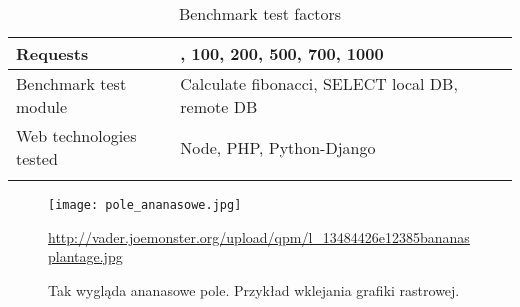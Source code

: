 \documentclass[../thesis.tex]{subfiles}
\begin{document}
\begin{table}[H]
	\caption{Benchmark test factors}
	\centering
	\footnotesize
	\label{tab1}
	\begin{tabular}{!{\color{sapphire}\vrule width 1pt}m{0.22\textwidth}!{\color{black}\vrule width 1pt}m{0.22\textwidth}!{\color{black}\vrule width 1pt}m{0.22\textwidth}!{\color{black}\vrule width 1pt}m{0.22\textwidth}!{\color{sapphire}\vrule width 1pt}}
		\hline
		\Centering Requests &
		, 100, 200, 500, 700, 1000 \\
		\hline
		\Centering Benchmark test module & 
		\Centering Calculate fibonacci, SELECT local DB, remote DB \\
		\hline
		\Centering Web technologies tested & 
		\Centering Node, PHP, Python-Django \\
		\hline
		\hline
	\end{tabular}
\end{table} 
\begin{figure}[H]
	\centering
	\texttt{[image: pole\_ananasowe.jpg]}
	\caption*{\url{http://vader.joemonster.org/upload/qpm/l_13484426e12385bananasplantage.jpg}} 
	\caption{Tak wygląda ananasowe pole. Przykład wklejania grafiki rastrowej.}
	\label{rys1}
\end{figure}
\end{document}
